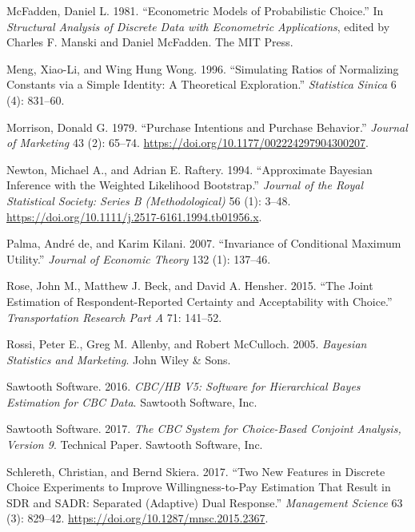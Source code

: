 \documentclass[
  letterpaper,
  DIV=11,
  numbers=noendperiod]{scrartcl}
\newlength{\cslhangindent}
\newenvironment{CSLReferences}[2] %
 {\begin{list}{}{%
  \setlength{\itemindent}{0pt}
  \setlength{\leftmargin}{0pt}
  \setlength{\parsep}{0pt}
  \ifodd #1
   \setlength{\leftmargin}{\cslhangindent}
   \setlength{\itemindent}{-1\cslhangindent}
  \fi
  \setlength{\itemsep}{#2\baselineskip}}}
 {\end{list}}
\theoremstyle{plain}
\theoremstyle{plain}
\theoremstyle{plain}
\theoremstyle{remark}
\begin{document}
\begin{CSLReferences}{1}{1}
McFadden, Daniel L. 1981. {``Econometric Models of Probabilistic
Choice.''} In \emph{Structural Analysis of Discrete Data with
Econometric Applications}, edited by Charles F. Manski and Daniel
McFadden. The MIT Press.

Meng, Xiao-Li, and Wing Hung Wong. 1996. {``Simulating Ratios of
Normalizing Constants via a Simple Identity: A Theoretical
Exploration.''} \emph{Statistica Sinica} 6 (4): 831--60.

Morrison, Donald G. 1979. {``Purchase Intentions and Purchase
Behavior.''} \emph{Journal of Marketing} 43 (2): 65--74.
\url{https://doi.org/10.1177/002224297904300207}.

Newton, Michael A., and Adrian E. Raftery. 1994. {``Approximate
{Bayesian} Inference with the Weighted Likelihood Bootstrap.''}
\emph{Journal of the Royal Statistical Society: Series B
(Methodological)} 56 (1): 3--48.
\url{https://doi.org/10.1111/j.2517-6161.1994.tb01956.x}.

Palma, André de, and Karim Kilani. 2007. {``Invariance of Conditional
Maximum Utility.''} \emph{Journal of Economic Theory} 132 (1): 137--46.

Rose, John M., Matthew J. Beck, and David A. Hensher. 2015. {``The Joint
Estimation of Respondent-Reported Certainty and Acceptability with
Choice.''} \emph{Transportation Research Part A} 71: 141--52.

Rossi, Peter E., Greg M. Allenby, and Robert McCulloch. 2005.
\emph{Bayesian Statistics and Marketing}. John Wiley \& Sons.

Sawtooth Software. 2016. \emph{{CBC/HB} V5: Software for {Hierarchical
Bayes} Estimation for {CBC} Data}. Sawtooth Software, Inc.

Sawtooth Software. 2017. \emph{The {CBC} System for Choice-Based
Conjoint Analysis, Version 9}. Technical Paper. Sawtooth Software, Inc.

Schlereth, Christian, and Bernd Skiera. 2017. {``Two New Features in
Discrete Choice Experiments to Improve Willingness-to-Pay Estimation
That Result in {SDR} and {SADR}: Separated (Adaptive) Dual Response.''}
\emph{Management Science} 63 (3): 829--42.
\url{https://doi.org/10.1287/mnsc.2015.2367}.


\end{CSLReferences}
\end{document}
